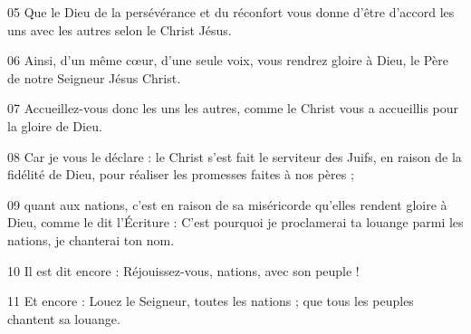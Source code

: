
05 Que le Dieu de la persévérance et du réconfort vous donne d’être d’accord les uns avec les autres selon le Christ Jésus.

06 Ainsi, d’un même cœur, d’une seule voix, vous rendrez gloire à Dieu, le Père de notre Seigneur Jésus Christ.

07 Accueillez-vous donc les uns les autres, comme le Christ vous a accueillis pour la gloire de Dieu.

08 Car je vous le déclare : le Christ s’est fait le serviteur des Juifs, en raison de la fidélité de Dieu, pour réaliser les promesses faites à nos pères ;

09 quant aux nations, c'est en raison de sa miséricorde qu'elles rendent gloire à Dieu, comme le dit l’Écriture : C’est pourquoi je proclamerai ta louange parmi les nations, je chanterai ton nom.

10 Il est dit encore : Réjouissez-vous, nations, avec son peuple !

11 Et encore : Louez le Seigneur, toutes les nations ; que tous les peuples chantent sa louange.
